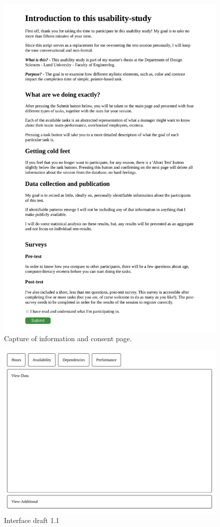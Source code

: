   \begin{figure}[h!]
    \centering
    \includegraphics[width=\textwidth]{figures/captures/webapp_information_consent.pdf}
    \caption{Capture of information and consent page.}
    \label{label_infoConsent}
  \end{figure}

  \begin{figure}
    \center
    \includegraphics[width=0.75\linewidth]{ui11.pdf}
    \caption{Interface draft 1.1}
  \end{figure}

